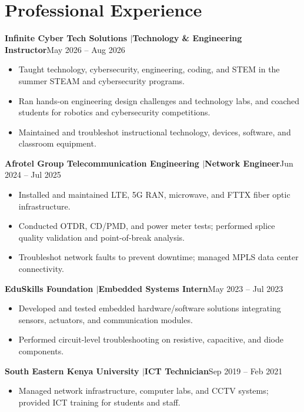 \documentclass[10.5pt,letterpaper]{article}
\newcommand{\entry}[2]{\textbf{#1}\hfill #2\par\nopagebreak}
\begin{document}
\section*{Professional Experience}
\entry{Infinite Cyber Tech Solutions \quad$|$\quad Technology \& Engineering Instructor}{May 2026 -- Aug 2026}
\begin{itemize}
  \item Taught technology, cybersecurity, engineering, coding, and STEM in the summer STEAM and
        cybersecurity programs.
  \item Ran hands-on engineering design challenges and technology labs, and coached students for
        robotics and cybersecurity competitions.
  \item Maintained and troubleshot instructional technology, devices, software, and classroom
        equipment.
\end{itemize}
\vspace{0.25em}
\entry{Afrotel Group Telecommunication Engineering \quad$|$\quad Network Engineer}{Jun 2024 -- Jul 2025}
\begin{itemize}
  \item Installed and maintained LTE, 5G RAN, microwave, and FTTX fiber optic infrastructure.
  \item Conducted OTDR, CD/PMD, and power meter tests; performed splice quality validation and
        point-of-break analysis.
  \item Troubleshot network faults to prevent downtime; managed MPLS data center connectivity.
\end{itemize}
\vspace{0.25em}
\entry{EduSkills Foundation \quad$|$\quad Embedded Systems Intern}{May 2023 -- Jul 2023}
\begin{itemize}
  \item Developed and tested embedded hardware/software solutions integrating sensors, actuators, and
        communication modules.
  \item Performed circuit-level troubleshooting on resistive, capacitive, and diode components.
\end{itemize}
\vspace{0.25em}
\entry{South Eastern Kenya University \quad$|$\quad ICT Technician}{Sep 2019 -- Feb 2021}
\begin{itemize}
  \item Managed network infrastructure, computer labs, and CCTV systems; provided ICT training for
        students and staff.
\end{itemize}
\end{document}
